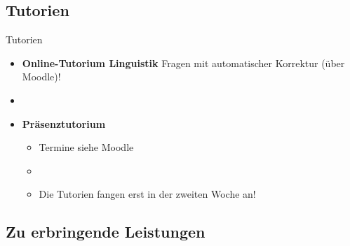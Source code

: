 %
\subsection{Tutorien}

\begin{frame}{Tutorien}

	\begin{itemize}
		\item \textbf{Online-Tutorium Linguistik} \ras Fragen mit automatischer Korrektur (über Moodle)!\\
		\item[]
		\item \textbf{Präsenztutorium}
		
		\begin{itemize}
			\item Termine siehe Moodle %
			\item[]
			\item Die Tutorien fangen erst in der zweiten Woche an!
		\end{itemize}
		
	\end{itemize}
	
\end{frame}


%
\subsection{Zu erbringende Leistungen}

